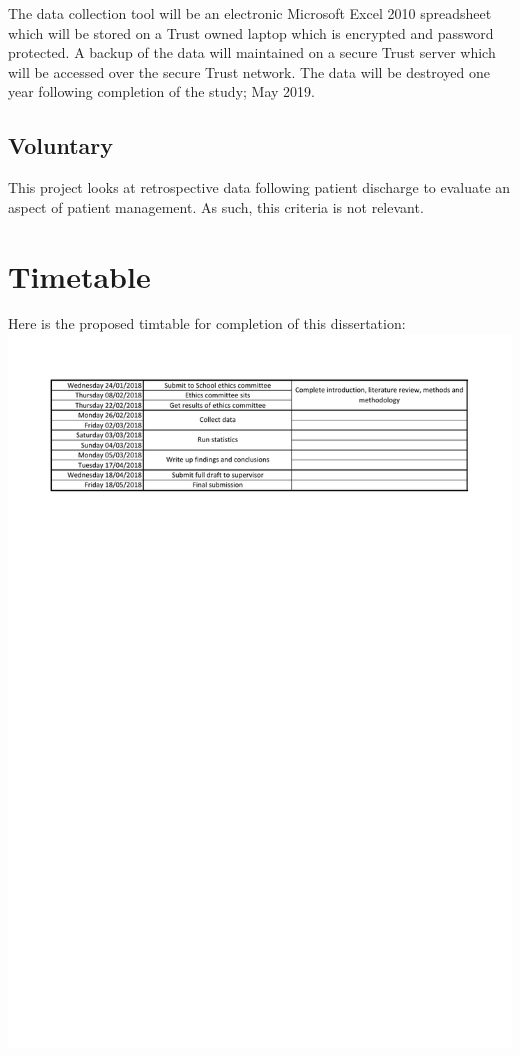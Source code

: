 \documentclass
[
	12pt,
	a4paper,
	oneside,
]{article}
\begin{document}
The data collection tool will be an electronic Microsoft Excel 2010 spreadsheet
which will be stored on a Trust owned laptop which is encrypted and password protected. A backup 
of the data will maintained on a secure Trust server which will be accessed over
the secure Trust network. The data will be destroyed one year following completion 
of the study; May 2019.

\subsection{Voluntary}

This project looks at retrospective data following patient discharge to evaluate 
an aspect of patient management. As such, this criteria is not relevant.

\section{Timetable}
Here is the proposed timtable for completion of this dissertation:
\includegraphics[width=\textwidth]{DissertationSchedule}
\end{document}
